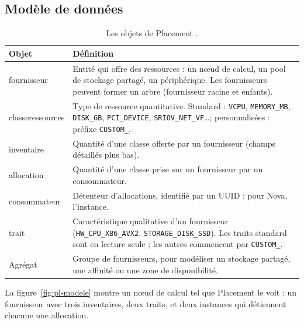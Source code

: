 \subsection{Modèle de données}\label{sec:pl-modele}

\begin{table}[!ht]
\centering
\renewcommand{\arraystretch}{1.3}
\begin{tabular}{@{}>{\raggedright\arraybackslash}p{3.7cm}>{\raggedright\arraybackslash}p{11.8cm}@{}}
\toprule
\textbf{Objet} & \textbf{Définition} \\
\midrule
\Gls{fournisseur} & Entité qui offre des ressources : un nœud de calcul, un pool de stockage partagé, un
  périphérique. Les fournisseurs peuvent former un arbre (fournisseur racine et enfants). \\
\Gls{classeressources} & Type de ressource quantitative. Standard : \texttt{VCPU}, \texttt{MEMORY\_MB},
  \texttt{DISK\_GB}, \texttt{PCI\_DEVICE}, \texttt{SRIOV\_NET\_VF}\dots ; personnalisées : préfixe \texttt{CUSTOM\_}. \\
\Gls{inventaire} & Quantité d'une classe offerte par un fournisseur (champs détaillés plus bas). \\
\Gls{allocation} & Quantité d'une classe prise sur un fournisseur par un consommateur. \\
\Gls{consommateur} & Détenteur d'allocations, identifié par un UUID : pour Nova, l'instance. \\
\Gls{trait} & Caractéristique qualitative d'un fournisseur (\texttt{HW\_CPU\_X86\_AVX2},
  \texttt{STORAGE\_DISK\_SSD}). Les traits standard sont en lecture seule ; les autres commencent par \texttt{CUSTOM\_}. \\
Agrégat & Groupe de fournisseurs, pour modéliser un stockage partagé, une affinité ou une zone de disponibilité. \\
\bottomrule
\end{tabular}
\caption{Les objets de Placement \parencite{placement-api-ref}.}
\label{tab:pl-objets}
\end{table}

La figure~\ref{fig:pl-modele} montre un nœud de calcul tel que Placement le voit : un fournisseur avec trois
inventaires, deux traits, et deux instances qui détiennent chacune une allocation.

